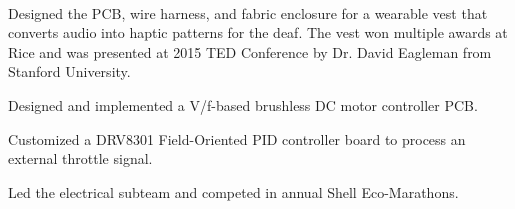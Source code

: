 \documentclass[]{deedy-resume-openfont}
\begin{document}
\begin{minipage}[t]{0.73\textwidth}
\href{https://www.youtube.com/watch?v=JTSGX6RYuiM}{} \\
\begin{tightemize}
\item Designed the PCB, wire harness, and fabric enclosure for a wearable vest that converts audio into haptic patterns for the deaf. The vest won multiple awards at Rice and was presented at 2015 TED Conference by Dr. David Eagleman from Stanford University.
\end{tightemize}
\sectionsep

\begin{tightemize}
\item Designed and implemented a V/f-based brushless DC motor controller PCB.
\item Customized a DRV8301 Field-Oriented PID controller board to process an external throttle signal.
\item Led the electrical subteam and competed in annual Shell Eco-Marathons.
\end{tightemize}
\sectionsep





\end{minipage} 
\end{document}
